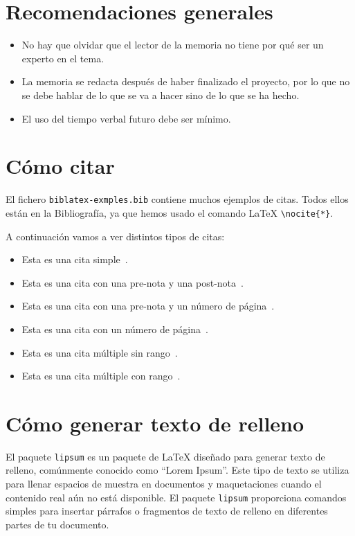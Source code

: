 \documentclass[a4paper,12pt]{report}
\begin{document}
\begin{appendices}

\chapter{Recomendaciones generales}

\begin{itemize}
\item No hay que olvidar que el lector de la memoria no tiene por qué ser un experto en el tema.
\item La memoria se redacta después de haber finalizado el proyecto, por lo que 
no se debe hablar de lo que se va a hacer sino de lo que se ha hecho.
\item El uso del tiempo verbal futuro debe ser mínimo.
\end{itemize}

\chapter{Cómo citar}

El fichero \texttt{biblatex-exmples.bib} contiene muchos ejemplos de citas. 
Todos ellos están en la Bibliografía, ya que hemos usado el comando \LaTeX{} \texttt{\textbackslash nocite\{*\}}.

A continuación vamos a ver distintos tipos de citas:
\begin{itemize}
    \item Esta es una cita simple~\cite{westfahl:space}.
    \item Esta es una cita con una pre-nota y una post-nota~\cite[pre-nota][post-nota]{westfahl:space}.
    \item Esta es una cita con una pre-nota y un número de página~\cite[pre-nota][42]{westfahl:space}.
    \item Esta es una cita con un número de página~\cite[][42]{westfahl:space}.
    \item Esta es una cita múltiple sin rango~\cites{westfahl:space, aksin}.
    \item Esta es una cita múltiple con rango~\cites{westfahl:space, angenendt, aksin}.
\end{itemize} 

\chapter{Cómo generar texto de relleno}

El paquete \texttt{lipsum} es un paquete de LaTeX diseñado para generar texto de relleno, comúnmente conocido como ``Lorem Ipsum''.
Este tipo de texto se utiliza para llenar espacios de muestra en documentos y maquetaciones cuando el contenido real aún no está disponible. 
El paquete \texttt{lipsum} proporciona comandos simples para insertar párrafos o fragmentos de texto de relleno en diferentes partes de tu documento.


\end{appendices}
\end{document}
